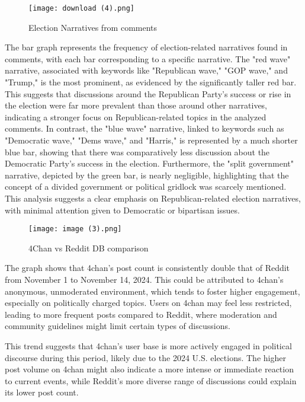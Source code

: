 \documentclass[sigconf]{acmart}
\begin{document}
\begin{figure}[h]
    \texttt{[image: download (4).png]}
    \caption{Election Narratives from comments}
    \label{fig:toxicity_distribution}
\end{figure}
The bar graph represents the frequency of election-related narratives found in comments, with each bar corresponding to a specific narrative. The "red wave" narrative, associated with keywords like "Republican wave," "GOP wave," and "Trump," is the most prominent, as evidenced by the significantly taller red bar. This suggests that discussions around the Republican Party's success or rise in the election were far more prevalent than those around other narratives, indicating a stronger focus on Republican-related topics in the analyzed comments. In contrast, the "blue wave" narrative, linked to keywords such as "Democratic wave," "Dems wave," and "Harris," is represented by a much shorter blue bar, showing that there was comparatively less discussion about the Democratic Party's success in the election. Furthermore, the "split government" narrative, depicted by the green bar, is nearly negligible, highlighting that the concept of a divided government or political gridlock was scarcely mentioned. This analysis suggests a clear emphasis on Republican-related election narratives, with minimal attention given to Democratic or bipartisan issues.



\begin{figure}[h]
    \texttt{[image: image (3).png]}
    \caption{4Chan vs Reddit DB comparison}
    \label{fig:hourly_comments}
\end{figure}
The graph shows that 4chan’s post count is consistently double that of Reddit from November 1 to November 14, 2024. This could be attributed to 4chan's anonymous, unmoderated environment, which tends to foster higher engagement, especially on politically charged topics. Users on 4chan may feel less restricted, leading to more frequent posts compared to Reddit, where moderation and community guidelines might limit certain types of discussions.

This trend suggests that 4chan's user base is more actively engaged in political discourse during this period, likely due to the 2024 U.S. elections. The higher post volume on 4chan might also indicate a more intense or immediate reaction to current events, while Reddit's more diverse range of discussions could explain its lower post count.
\end{document}
